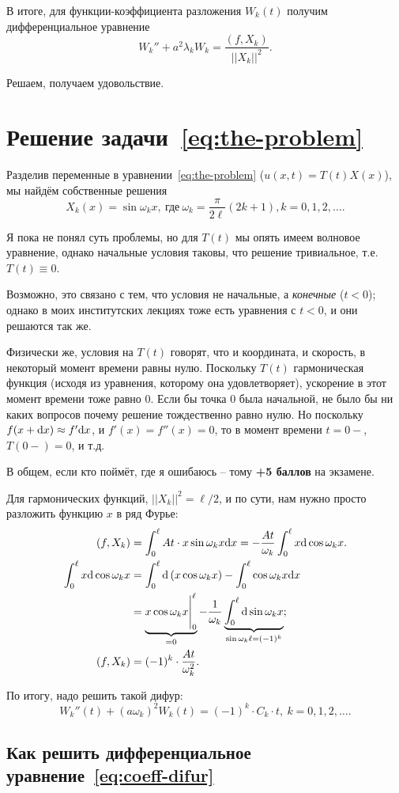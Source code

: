 \documentclass{report}
\newcommand{\w}{\omega}
\begin{document}
В итоге, для функции-коэффициента разложения $W_k(t)$ получим дифференциальное уравнение
\begin{equation}\label{eq:coeff-difur}
	W_k'' + a^2\lambda_kW_k = \frac{(f, X_k)}{||X_k||^2}.
\end{equation}

Решаем, получаем удовольствие.

\section{Решение задачи~\eqref{eq:the-problem}}
Разделив переменные в уравнении~\eqref{eq:the-problem} ($u(x,t) = T(t)X(x)$),  мы найдём собственные решения 
\[
X_k(x) = \sin\w_kx,~\text{где}~\w_k = \frac{\pi}{2\ell}(2k+1), k=0,1,2,\dots.
\]
\begin{rmk}
	Я пока не понял суть проблемы, но для $T(t)$ мы опять имеем волновое уравнение, 
	однако начальные условия таковы, что решение тривиальное, т.е. $T(t)\equiv 0$.
	
	Возможно, это связано с тем, что условия не начальные, а \emph{конечные} ($t<0$); однако в моих
	институтских лекциях тоже есть уравнения с $t<0$, и они решаются так же.
	
	Физически же, условия на $T(t)$ говорят, что и координата, и скорость, в некоторый момент времени равны нулю. 
	Поскольку $T(t)$ гармоническая функция (исходя из уравнения, которому она удовлетворяет), ускорение 
	в этот момент времени тоже равно 0. Если бы точка 0 была начальной, не было бы ни каких вопросов 
	почему решение тождественно равно нулю. Но поскольку $f(x+\mathrm d x) \approx f'\mathrm d x$, и $f'(x) = f'' (x) =0$,
	то в момент времени $t=0-$, $T(0-)=0$, и т.д.
	
	В общем, если кто поймёт, где я ошибаюсь -- тому \textbf{+5 баллов} на экзамене.
\end{rmk}

Для гармонических функций, $||X_k||^2 = \ell/2$, и по сути, нам нужно просто 
разложить функцию $x$ в ряд Фурье:
\begin{align*}
	(f,X_k) &= \int_0^\ell At\cdot x\sin\w_k x\rd x = -\frac{At}{\w_k}\int_0^\ell x\rd\cos\w_kx.\\
	\int_0^\ell x\rd\cos\w_kx &= \int_0^\ell\rd\left(x\cos\w_kx\right) - \int_0^\ell\cos\w_kx\rd x \\
	&= \underbrace{x\cos\w_kx\Bigg\vert_0^\ell}_{=0} - \frac{1}{\w_k}\underbrace{\int_0^\ell\rd\sin\w_kx}_{\sin\w_k\ell=(-1)^k};\\
	(f, X_k) &= (-1)^k \cdot \frac{At}{\w_k^2}.
\end{align*}

По итогу, надо решить такой дифур:
\begin{equation}\label{eq:final-difur}
	W_k''(t) + (a\w_k)^2W_k(t) = (-1)^k\cdot C_k\cdot t,~k=0,1,2,\dots.
\end{equation}

\subsection{Как решить дифференциальное уравнение~\eqref{eq:coeff-difur}}
\end{document}
